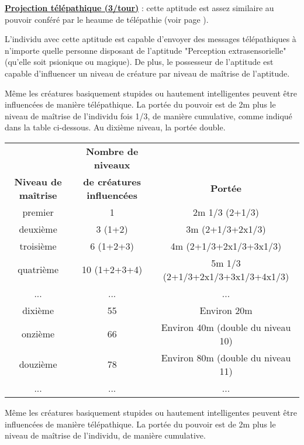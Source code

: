 \bigskip

\label{magicien-projection-telepathique}\textbf{\uline{Projection télépathique (3/tour)}} : cette aptitude est assez similaire au pouvoir conféré par le heaume de télépathie (voir page \pageref{objet-heaume-telepathie}).

\bigskip

L'individu avec cette aptitude est capable d'envoyer des messages télépathiques à n'importe quelle personne  disposant de l'aptitude "Perception extrasensorielle" (qu'elle soit psionique ou magique). De plus, le possesseur de l'aptitude est capable d'influencer un niveau de créature par niveau de maîtrise de l'aptitude.

\bigskip

Même les créatures basiquement stupides ou hautement intelligentes peuvent être influencées de manière télépathique. La portée du pouvoir est de 2m plus le niveau de maîtrise de l'individu fois 1/3, de manière cumulative, comme indiqué dans la table ci-dessous. Au dixième niveau, la portée double.

\bigskip

\begin{tabular}{ccc}
                            &\textbf{Nombre de niveaux} &\\
\textbf{Niveau de maîtrise} & \textbf{de créatures influencées} & \textbf{Portée}\\
premier     & 1             & 2m 1/3 (2+1/3)\\
deuxième    & 3 (1+2)       & 3m (2+1/3+2x1/3)\\
troisième   & 6 (1+2+3)     & 4m (2+1/3+2x1/3+3x1/3)\\
quatrième   & 10 (1+2+3+4)  & 5m 1/3 (2+1/3+2x1/3+3x1/3+4x1/3)\\
...         & ...           & ...\\
dixième     & 55            & Environ 20m \\
onzième     & 66            & Environ 40m (double du niveau 10) \\
douzième    & 78            & Environ 80m (double du niveau 11) \\
...         & ...           & ... \\
\end{tabular}

\bigskip

Même les créatures basiquement stupides ou hautement intelligentes peuvent être influencées de manière télépathique. La portée du pouvoir est de 2m plus le niveau de maîtrise de l'individu, de manière cumulative.

